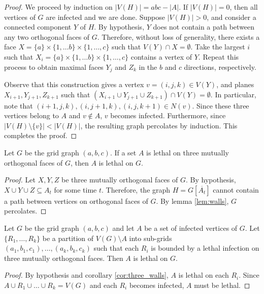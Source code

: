 \begin{proof}
We proceed by induction on $|V(H)| = abc - |A|$. If $|V(H)| = 0$, then all vertices of $G$ are infected and we are done. Suppose $|V(H)| > 0$, and consider a connected component $Y$ of $H$. By hypothesis, $Y$ does not contain a path between any two orthogonal faces of $G$. Therefore, without loss of generality, there exists a face $X = \{a\} \times \{1, \dots b\} \times \{1, \dots, c\}$ such that $V(Y) \cap X = \emptyset$. Take the largest $i$ such that $X_i = \{a\} \times \{1, \dots b\} \times \{1, \dots, c\}$ contains a vertex of $Y$. Repeat this process to obtain maximal faces $Y_j$ and $Z_k$ in the $b$ and $c$ directions, respectively. 

Observe that this construction gives a vertex $v = (i,j,k) \in V(Y)$, and planes $X_{i+1}, Y_{j+1}, Z_{k+1}$ such that $(X_{i+1} \cup Y_{j+1} \cup Z_{k+1}) \cap  V(Y) = \emptyset$. In particular, note that $(i+1,j,k), (i,j+1,k),(i,j,k+1) \in N(v)$. Since these three vertices belong to $A$ and $v \notin A$, $v$ becomes infected. Furthermore, since $|V(H) \setminus \{v\}| < |V(H)|$, the resulting graph percolates by induction. This completes the proof.
\end{proof}

\begin{cor}
\label{cor:three_walls}
Let $G$ be the grid graph $(a,b,c)$. If a set $A$ is lethal on three mutually orthogonal faces of $G$, then $A$ is lethal on $G$.
\end{cor}

\begin{proof}
Let $X, Y, Z$ be three mutually orthogonal faces of $G$. By hypothesis, $X \cup Y \cup Z \subseteq A_t$ for some time $t$. Therefore, the graph $H = G[\overline{A_t}]$ cannot contain a path between vertices on orthogonal faces of $G$. By lemma \ref{lem:walls}, $G$ percolates.
\end{proof}

\begin{cor}
\label{cor:manifold}
Let $G$ be the grid graph $(a,b,c)$ and let $A$ be a set of infected vertices of $G$. Let $\{R_1, \dots, R_k\} $ be a partition of $V(G) \setminus A$ into sub-grids $(a_1,b_1,c_1), \dots, (a_k,b_k,c_k)$ such that each $R_i$ is bounded by a lethal infection on three mutually orthogonal faces. Then $A$ is lethal on $G$.
\end{cor}

\begin{proof}
By hypothesis and corollary \ref{cor:three_walls}, $A$ is lethal on each $R_i$. Since $A \cup R_1 \cup \dots \cup R_k = V(G)$ and each $R_i$ becomes infected, $A$ must be lethal.
\end{proof}

